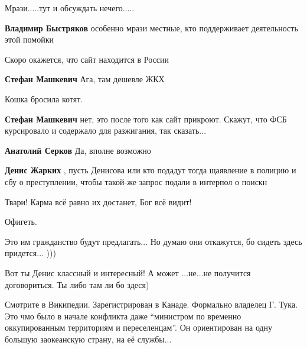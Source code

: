  
 
 
 
 
\zzSecCmt

\begin{itemize} %
Мрази.....тут и обсуждать нечего.....

\textbf{Владимир Быстряков} особенно мрази местные, кто поддерживает деятельность этой помойки

Скоро окажется, что сайт находится в России

\begin{itemize} %
\textbf{Стефан Машкевич} Ага, там дешевле ЖКХ

Кошка бросила котят.

\textbf{Стефан Машкевич} нет, это после того как сайт прикроют. Скажут, что ФСБ курсировало и содержало для разжигания, так сказать...

\textbf{Анатолий Серков} Да, вполне возможно


\textbf{Денис Жарких} , пусть Денисова или кто подадут тогда щаявление в полицию и сбу о преступлении, чтобы такой-же запрос подали в интерпол о поискн
\end{itemize} %

Твари! Карма всё равно их достанет, Бог всё видит!

Офигеть.

Это им гражданство будут предлагать... Но думаю они откажутся, бо сидеть здесь придется... )))

Вот ты Денис классный и интересный!
А может ...не...не получится договориться.
Ты либо там ли бо здеся)


Смотрите в Википедии. Зарегистрирован в Канаде. Формально владелец Г. Тука. Это
чмо было в начале конфликта даже \enquote{министром по временно оккупированным
территориям и переселенцам}. Он ориентирован на одну большую заокеанскую
страну, на её службы...


\end{itemize}
